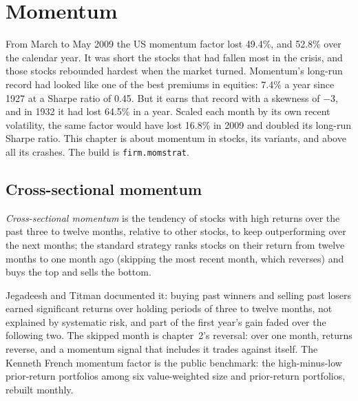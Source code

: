 \chapter{Momentum}\label{ch:s1:momentum}

From March to May 2009 the US momentum factor lost 49.4\%, and 52.8\% over the calendar year. It was short the stocks that had fallen most in the crisis, and
those stocks rebounded hardest when the market turned. Momentum's long-run record had looked like one of the best premiums in equities: 7.4\% a year since
1927 at a Sharpe ratio of 0.45. But it earns that record with a skewness of $-3$, and in 1932 it had lost 64.5\% in a year. Scaled each month by its
own recent volatility, the same factor would have lost 16.8\% in 2009 and doubled its long-run Sharpe ratio. This chapter is about momentum in stocks, its
variants, and above all its crashes. The build is \texttt{firm.momstrat}.

\section{Cross-sectional momentum}

\begin{definition}\label{def:s1:momentum:cross}
\emph{Cross-sectional momentum} is the tendency of stocks with high returns over the past three to twelve months, relative to
other stocks, to keep outperforming over the next months; the standard strategy ranks stocks on their return from twelve months to one month ago (skipping the
most recent month, which reverses) and buys the top and sells the bottom.
\end{definition}

Jegadeesh and Titman documented it: buying past winners and selling past losers earned significant returns over holding periods of three to twelve
months, not explained by systematic risk, and part of the first year's gain faded over the following two. The skipped month is chapter~2's reversal: over one
month, returns reverse, and a momentum signal that includes it trades against itself. The Kenneth French momentum factor is the public benchmark: the
high-minus-low prior-return portfolios among six value-weighted size and prior-return portfolios, rebuilt monthly.


